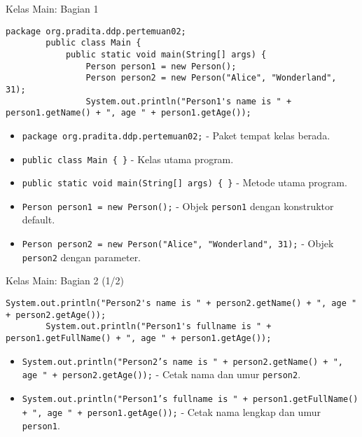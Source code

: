 \documentclass[aspectratio=169, table]{beamer}
\begin{document}
\begin{frame}[fragile]{Kelas Main: Bagian 1}
\vspace{10pt}
	\begin{lstlisting}[style=JavaStyle]
		package org.pradita.ddp.pertemuan02;
		public class Main {
			public static void main(String[] args) {
				Person person1 = new Person();
				Person person2 = new Person("Alice", "Wonderland", 31);
				System.out.println("Person1's name is " + person1.getName() + ", age " + person1.getAge());
			\end{lstlisting}
			
			\begin{itemize}
				\item \texttt{package org.pradita.ddp.pertemuan02;} - Paket tempat kelas berada.
				\item \texttt{public class Main \{ \}} - Kelas utama program.
				\item \texttt{public static void main(String[] args) \{ \}} - Metode utama program.
				\item \texttt{Person person1 = new Person();} - Objek \texttt{person1} dengan konstruktor default.
				\item \texttt{Person person2 = new Person("Alice", "Wonderland", 31);} - Objek \texttt{person2} dengan parameter.
			\end{itemize}
		\end{frame}

		
\begin{frame}[fragile]{Kelas Main: Bagian 2 (1/2)}
	\begin{lstlisting}[style=JavaStyle]
		System.out.println("Person2's name is " + person2.getName() + ", age " + person2.getAge());
		System.out.println("Person1's fullname is " + person1.getFullName() + ", age " + person1.getAge());
	\end{lstlisting}
	
	\begin{itemize}
		\item \texttt{System.out.println("Person2's name is " + person2.getName() + ", age " + person2.getAge());} - Cetak nama dan umur \texttt{person2}.
		\item \texttt{System.out.println("Person1's fullname is " + person1.getFullName() + ", age " + person1.getAge());} - Cetak nama lengkap dan umur \texttt{person1}.
	\end{itemize}
\end{frame}
\end{document}
